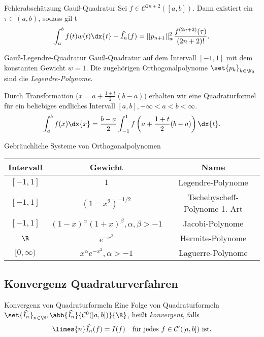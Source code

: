 \begin{karte}{Fehlerabschätzung Gauß-Quadratur}
    Sei \( f \in \mathcal{C}^{2n+2}([a,b]) \). Dann existiert ein \( \tau \in (a,b) \), 
    sodass gil t
    \[ \int_a^b f(t) w(t) \dx{t} - \widehat{I_n}(f) = || p_{n+1} ||_w^2 \frac{ f^{(2n+2)}(\tau) }{ (2n+2)! }. \]
\end{karte}

\begin{karte}{Gauß-Legendre-Quadratur}
    Gauß-Quadratur auf dem Intervall \( [-1,1] \) mit dem konstanten Gewicht \( w = 1 \).
    Die zugehörigen Orthogonalpolynome \( \set{p_k}_{k\in\N_0} \) sind die \textit{Legendre-Polynome}.

    Durch Transformation (\( x = a + \frac{1+t}{2}(b-a) \)) erhalten wir eine Quadraturformel für ein beliebiges endliches 
    Intervall \( [a,b], -\infty < a < b < \infty \). 
    \[ \int_a^b f(x) \dx{x} = \frac{b-a}{2} \int_{-1}^1 f\left( a + \frac{ 1+t }{2}(b-a) \right) \dx{t}. \]
\end{karte}

\begin{karte}{Gebräuchliche Systeme von Orthogonalpolynomen}
    \begin{center}
    \begin{tabular}{c|c|c}
        Intervall & Gewicht & Name \\\hline
        \( [-1,1] \) & \(1\) & Legendre-Polynome\\[5pt]
        \( [-1,1] \) & \( (1-x^2)^{-1/2} \) & Tschebyscheff-Polynome 1. Art \\[5pt]
        \( [-1,1] \) & \( (1-x)^\alpha (1+x)^\beta, \alpha, \beta > -1 \) & Jacobi-Polynome \\[5pt]
        \( \R \) & \( e^{-x^2} \) & Hermite-Polynome \\[5pt]
        \( [0,\infty) \) & \( x^\alpha e^{-x^2}, \alpha > -1 \) & Laguerre-Polynome
    \end{tabular}
    \end{center}
\end{karte}

\subsection*{Konvergenz Quadraturverfahren}

\begin{karte}{Konvergenz von Quadraturformeln}
    Eine Folge von Quadraturformeln \( \set{\widehat{I_n}}_{n\in\N}, \abb{\widehat{I_n}}{\mathcal{C}^0([a,b])}{\R} \), 
    heißt \textit{konvergent}, falls 
    \[ \limes{n} \widehat{I_n}(f) = I(f) \quad \text{für jedes } f \in \mathcal{C^0}([a,b]) \text{ ist}. \]
\end{karte}


